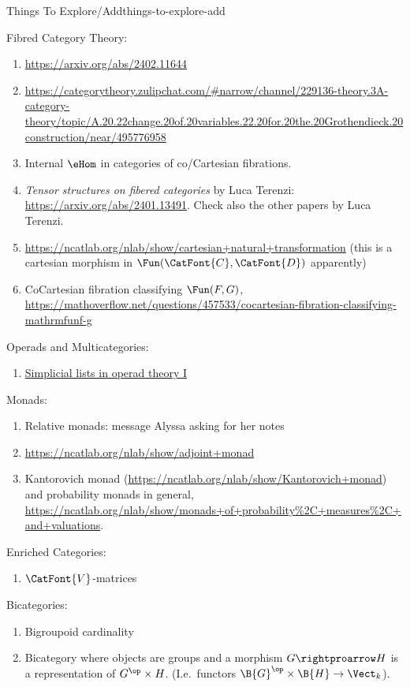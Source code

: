 \begin{remark}{Things To Explore/Add}{things-to-explore-add}
\begin{enumerate}
    \end{enumerate}
    Fibred Category Theory:
    \begin{enumerate}
        \item \url{https://arxiv.org/abs/2402.11644}
        \item \url{https://categorytheory.zulipchat.com/#narrow/channel/229136-theory.3A-category-theory/topic/A.20.22change.20of.20variables.22.20for.20the.20Grothendieck.20construction/near/495776958}
        \item Internal $\eHom$ in categories of co/Cartesian fibrations.
        \item \textit{Tensor structures on fibered categories} by Luca Terenzi: \url{https://arxiv.org/abs/2401.13491}. Check also the other papers by Luca Terenzi.
        \item \url{https://ncatlab.org/nlab/show/cartesian+natural+transformation} (this is a cartesian morphism in $\Fun(\CatFont{C},\CatFont{D})$ apparently)
        \item CoCartesian fibration classifying $\Fun(F,G)$, \url{https://mathoverflow.net/questions/457533/cocartesian-fibration-classifying-mathrmfunf-g}
    \end{enumerate}
    Operads and Multicategories:
    \begin{enumerate}
        \item \href{https://arxiv.org/abs/2405.10072}{Simplicial lists in operad theory I}
    \end{enumerate}
    Monads:
    \begin{enumerate}
        \item Relative monads: message Alyssa asking for her notes
        \item \url{https://ncatlab.org/nlab/show/adjoint+monad}
        \item Kantorovich monad (\url{https://ncatlab.org/nlab/show/Kantorovich+monad}) and probability monads in general, \url{https://ncatlab.org/nlab/show/monads+of+probability\%2C+measures\%2C+and+valuations}.
    \end{enumerate}
    Enriched Categories:
    \begin{enumerate}
        \item $\CatFont{V}$-matrices
    \end{enumerate}
    Bicategories:
    \begin{enumerate}
        \item Bigroupoid cardinality
        \item Bicategory where objects are groups and a morphism $G\rightproarrow H$ is a representation of $G^{\op}\times H$. (I.e.\ functors $\B{G}^{\op}\times\B{H}\to\Vect_{k}$).

\end{enumerate}
\end{remark}
